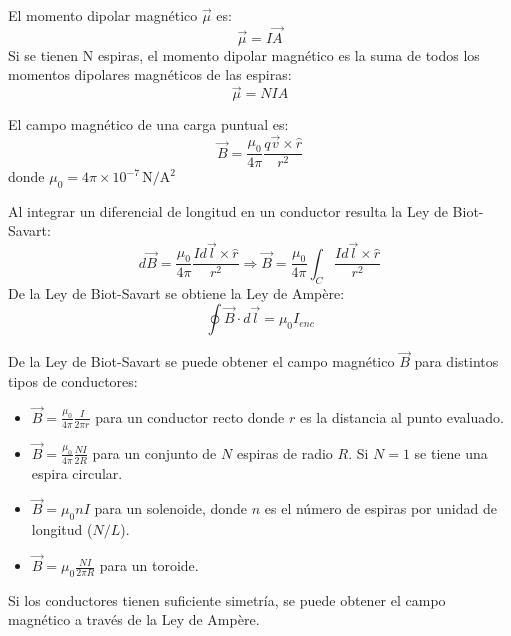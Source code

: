 \begin{tcolorbox}[title=Momento dipolar magnético]
  El momento dipolar magnético \(\vec{\mu}\) es:
  \[
    \vec{\mu} = I\vec{A}
  \]
  Si se tienen N espiras, el momento dipolar magnético es la suma de todos los momentos dipolares magnéticos de las espiras:
  \[
    \vec{\mu} = NIA
  \]
\end{tcolorbox}

\begin{tcolorbox}[title=Fuentes de campo magnético]
  El campo magnético de una carga puntual es:
  \[
    \vec{B} = \frac{\mu_0}{4\pi} \frac{q\vec{v} \times \hat{r}}{r^2}
  \]
  donde \(\mu_0 = 4\pi \times 10^{-7} \, \mathrm{N/A^2}\)
  
  Al integrar un diferencial de longitud en un conductor resulta la Ley de Biot-Savart:
  \[
    d\vec{B} = \frac{\mu_0}{4\pi} \frac{Id\vec{l} \times \hat{r}}{r^2} \Rightarrow \vec{B} = \frac{\mu_0}{4\pi} \int_C \frac{Id\vec{l} \times \hat{r}}{r^2}
  \]
  De la Ley de Biot-Savart se obtiene la Ley de Ampère:
  \[
    \oint \vec{B} \cdot d\vec{l} = \mu_0 I_{enc}
  \]
\end{tcolorbox}

\begin{tcolorbox}[title=Campo magnético para distintos conductores]
  De la Ley de Biot-Savart se puede obtener el campo magnético \(\vec{B}\) para distintos tipos de conductores:
  \begin{itemize}
    \item \(\vec{B} = \frac{\mu_0}{4\pi} \frac{I}{2\pi r}\) para un conductor recto donde \(r\) es la distancia al punto evaluado.
    \item \(\vec{B} = \frac{\mu_0}{4\pi} \frac{NI}{2 R}\) para un conjunto de \(N\) espiras de radio \(R\). Si \(N=1\) se tiene una espira circular.
    \item \(\vec{B} = \mu_0 n I\) para un solenoide, donde \(n\) es el número de espiras por unidad de longitud (\(N/L\)).
    \item \(\vec{B} = \mu_0 \frac{NI}{2\pi R}\) para un toroide.
  \end{itemize}
  Si los conductores tienen suficiente simetría, se puede obtener el campo magnético a través de la Ley de Ampère.
\end{tcolorbox}
